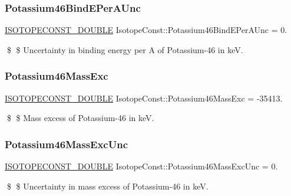 \subsubsection{\texorpdfstring{Potassium46\+Bind\+E\+Per\+A\+Unc}{Potassium46BindEPerAUnc}}
{\footnotesize\ttfamily \mbox{\hyperlink{group___isotope_const-_macros_ga8f45a7272ce02c0b4c65c44636ed719a}{I\+S\+O\+T\+O\+P\+E\+C\+O\+N\+S\+T\+\_\+\+D\+O\+U\+B\+LE}} Isotope\+Const\+::\+Potassium46\+Bind\+E\+Per\+A\+Unc = 0.}

\$ \$ Uncertainty in binding energy per A of Potassium-\/46 in keV. \mbox{\label{group___isotope_const-_potassium-_k46_ga40e1dd4ce4fa0d02b65088e6972fb536}} 
\subsubsection{\texorpdfstring{Potassium46\+Mass\+Exc}{Potassium46MassExc}}
{\footnotesize\ttfamily \mbox{\hyperlink{group___isotope_const-_macros_ga8f45a7272ce02c0b4c65c44636ed719a}{I\+S\+O\+T\+O\+P\+E\+C\+O\+N\+S\+T\+\_\+\+D\+O\+U\+B\+LE}} Isotope\+Const\+::\+Potassium46\+Mass\+Exc = -\/35413.}

\$ \$ Mass excess of Potassium-\/46 in keV. \mbox{\label{group___isotope_const-_potassium-_k46_ga4eea026db9c2267b863ef451b062d8f8}} 
\subsubsection{\texorpdfstring{Potassium46\+Mass\+Exc\+Unc}{Potassium46MassExcUnc}}
{\footnotesize\ttfamily \mbox{\hyperlink{group___isotope_const-_macros_ga8f45a7272ce02c0b4c65c44636ed719a}{I\+S\+O\+T\+O\+P\+E\+C\+O\+N\+S\+T\+\_\+\+D\+O\+U\+B\+LE}} Isotope\+Const\+::\+Potassium46\+Mass\+Exc\+Unc = 0.}

\$ \$ Uncertainty in mass excess of Potassium-\/46 in keV. \mbox{\label{group___isotope_const-_potassium-_k46_gacc72c680c3e9f6fbf506c1745b612740}} 

